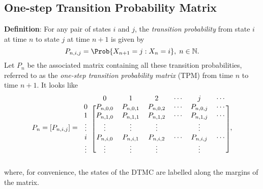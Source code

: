 \subsection*{One-step Transition Probability Matrix}
\begin{Regular}
    \textbf{Definition}: For any pair of states $ i $ and $ j $, the \emph{transition probability} from state $ i $ at time $ n $
    to state $ j $ at time $ n+1 $ is given by
    \[ P_{n,i,j}=\Prob{X_{n+1}=j\given X_n=i},\; n\in\mathbb{N}. \]
    Let $ P_n $ be the associated matrix containing all these transition probabilities, referred to as the
    \emph{one-step transition probability matrix} (TPM) from time $ n $ to time $ n+1 $. It looks like
    \[ P_n=[P_{n,i,j}]=
        \begin{blockarray}{cccccccc}
            & 0 & 1 & 2 & \cdots & j & \cdots \\
            \begin{block}{c[ccccccc]}
                0 & P_{n, 0,0}  & P_{n, 0,1}  & P_{n, 0,2}  & \cdots & P_{n, 0, j} & \cdots \\
                1 & P_{n, 1,0}  & P_{n, 1,1}  & P_{n, 1,2}  & \cdots & P_{n, 1, j} & \cdots \\
                \vdots & \vdots      & \vdots      & \vdots      &        & \vdots      &        \\
                i & P_{n, i, 0} & P_{n, i, 1} & P_{n, i, 2} & \cdots & P_{n, i, j} & \cdots \\
                \vdots & \vdots      & \vdots      & \vdots      &        & \vdots      &\\
            \end{block}
        \end{blockarray}, \]
    where, for convenience, the states of the DTMC are labelled along the margins of the matrix.


\end{Regular}
